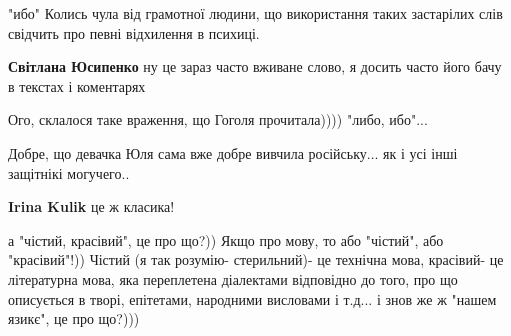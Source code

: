 "ибо" Колись чула від грамотної людини, що використання таких застарілих слів свідчить про певні відхилення в психиці.

\begin{itemize}
 
\textbf{Світлана Юсипенко} ну це зараз часто вживане слово, я досить часто його бачу в текстах і коментарях
\end{itemize}

 
Ого, склалося таке враження, що Гоголя прочитала)))) "либо, ибо"...

 
Добре, що девачка Юля сама вже добре вивчила російську... як і усі інші защітнікі могучего..

\begin{itemize}
 
\textbf{Irina Kulik} це ж класика!
\end{itemize}

 

а "чістий, красівий", це про що?)) Якщо про мову, то або "чістий", або
"красівий"!)) Чістий (я так розумію- стерильний)- це технічна мова, красівий-
це літературна мова, яка переплетена діалектами відповідно до того, про що
описується в творі, епітетами, народними висловами і т.д... і знов же ж "нашем
язикє", це про що?)))

